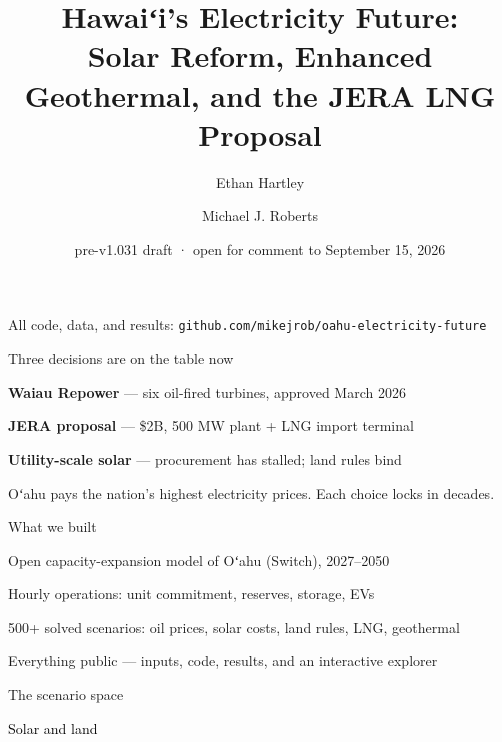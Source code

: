 \documentclass[11pt,aspectratio=169]{beamer}
\title{\textcolor{uhgreen}{Hawaiʻi's Electricity Future:\\
  Solar Reform, Enhanced Geothermal, and the JERA LNG Proposal}}
\author{Ethan Hartley \and Michael J. Roberts}
\institute{University of Hawaiʻi at Mānoa — Economics, Sea Grant, UHERO}
\date{pre-v1.031 draft · open for comment to September 15, 2026}
\begin{document}
\begin{frame}
\maketitle
\vfill
\footnotesize All code, data, and results:
\texttt{github.com/mikejrob/oahu-electricity-future}
\end{frame}

\begin{frame}{Three decisions are on the table now}
\begin{wideitemize}
  \item \textbf{Waiau Repower} — six oil-fired turbines, approved March 2026
  \item \textbf{JERA proposal} — \$2B, 500 MW plant + LNG import terminal
  \item \textbf{Utility-scale solar} — procurement has stalled; land rules bind
\end{wideitemize}
\vspace{0.4cm}
Oʻahu pays the nation's highest electricity prices. Each choice locks in
decades.
\end{frame}

\begin{frame}{What we built}
\begin{wideitemize}
  \item Open capacity-expansion model of Oʻahu (Switch), 2027--2050
  \item Hourly operations: unit commitment, reserves, storage, EVs
  \item 500+ solved scenarios: oil prices, solar costs, land rules,
        LNG, geothermal
  \item Everything public --- inputs, code, results, and an interactive
        explorer
\end{wideitemize}
\end{frame}

\begin{frame}{The scenario space}
\end{frame}

\begin{transitionframe}
  \begin{center}{\Huge \textcolor{black}{Solar and land}}\end{center}
\end{transitionframe}
\end{document}
